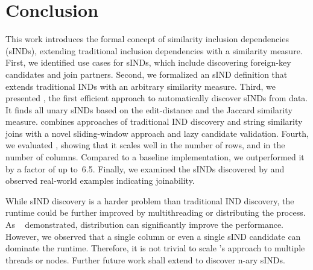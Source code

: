 \section{Conclusion}
\label{section:discussion}

This work introduces the formal concept of similarity inclusion dependencies (sINDs), extending traditional inclusion dependencies with a similarity measure.
First, we identified use cases for sINDs, which include discovering foreign-key candidates and join partners.
Second, we formalized an sIND definition that extends traditional INDs with an arbitrary similarity measure.
Third, we presented \sawfish, the first efficient approach to automatically discover sINDs from data.
It finds all unary sINDs based on the edit-distance and the Jaccard similarity measure.
\sawfish combines approaches of traditional IND discovery and string similarity joins with a novel sliding-window approach and lazy candidate validation.
Fourth, we evaluated \sawfish, showing that it scales well in the number of rows, and in the number of columns.
Compared to a baseline implementation, we outperformed it by a factor of up to~6.5.
Finally, we examined the sINDs discovered by \sawfish and observed real-world examples indicating joinability.

While sIND discovery is a harder problem than traditional IND discovery, the runtime could be further improved by multithreading or distributing the process.
As ~\cite{dursch2019eval} demonstrated, distribution can significantly improve the performance.
However, we observed that a single column or even a single sIND candidate can dominate the runtime.
Therefore, it is not trivial to scale \sawfish's approach to multiple threads or nodes.
Further future work shall extend \sawfish to discover n-ary sINDs.
